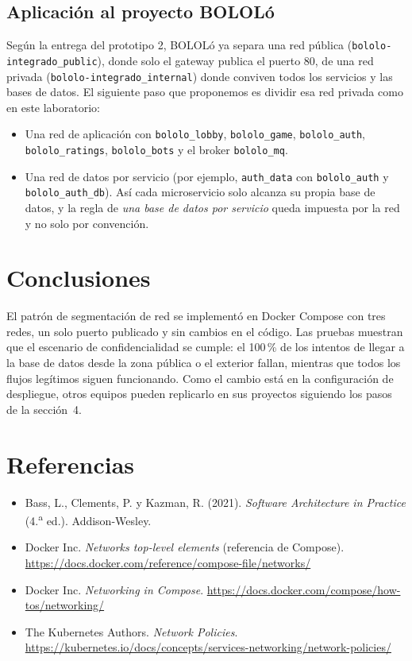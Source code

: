\documentclass[11pt,letterpaper]{article}
\newcommand{\code}[1]{\texttt{#1}}
\begin{document}
\subsection{Aplicación al proyecto BOLOLó}

Según la entrega del prototipo 2, BOLOLó ya separa una red pública
(\code{bololo-integrado\_public}), donde solo el gateway publica el puerto 80, de una
red privada (\code{bololo-integrado\_internal}) donde conviven todos los servicios y
las bases de datos. El siguiente paso que proponemos es dividir esa red privada como
en este laboratorio:

\begin{itemize}
  \item Una red de aplicación con \code{bololo\_lobby}, \code{bololo\_game}, \code{bololo\_auth}, \code{bololo\_ratings}, \code{bololo\_bots} y el broker \code{bololo\_mq}.
  \item Una red de datos por servicio (por ejemplo, \code{auth\_data} con \code{bololo\_auth} y \code{bololo\_auth\_db}). Así cada microservicio solo alcanza su propia base de datos, y la regla de \emph{una base de datos por servicio} queda impuesta por la red y no solo por convención.
\end{itemize}

\section{Conclusiones}

El patrón de segmentación de red se implementó en Docker Compose con tres redes, un
solo puerto publicado y sin cambios en el código. Las pruebas muestran que el
escenario de confidencialidad se cumple: el 100\,\% de los intentos de llegar a la
base de datos desde la zona pública o el exterior fallan, mientras que todos los
flujos legítimos siguen funcionando. Como el cambio está en la configuración de
despliegue, otros equipos pueden replicarlo en sus proyectos siguiendo los pasos de
la sección~4.

\section*{Referencias}

\begin{itemize}[leftmargin=*]
  \item Bass, L., Clements, P. y Kazman, R. (2021). \emph{Software Architecture in Practice} (4.\textsuperscript{a} ed.). Addison-Wesley.
  \item Docker Inc. \emph{Networks top-level elements} (referencia de Compose). \url{https://docs.docker.com/reference/compose-file/networks/}
  \item Docker Inc. \emph{Networking in Compose}. \url{https://docs.docker.com/compose/how-tos/networking/}
  \item The Kubernetes Authors. \emph{Network Policies}. \url{https://kubernetes.io/docs/concepts/services-networking/network-policies/}
\end{itemize}
\end{document}
